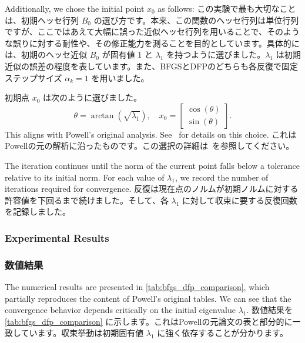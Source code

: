 \documentclass[0_main]{subfiles}
\begin{document}
    Additionally, we chose the initial point $x_0$ as follows:
\else
    この実験で最も大切なことは、初期ヘッセ行列 $B_0$ の選び方です。本来、この関数のヘッセ行列は単位行列ですが、ここではあえて大幅に誤った近似ヘッセ行列を用いることで、そのような誤りに対する耐性や、その修正能力を測ることを目的としています。具体的には、初期のヘッセ近似 $B_0$ が固有値 1 と $\lambda_1$ を持つように選びました。$\lambda_1$ は初期近似の誤差の程度を表しています。また、BFGSとDFPのどちらも各反復で固定ステップサイズ $\alpha_k = 1$ を用いました。

    初期点 $x_0$ は次のように選びました。
\fi
\begin{equation*}
    \theta = \arctan(\sqrt{\lambda_1}), \quad x_0 = \begin{bmatrix}\cos(\theta) \\ \sin(\theta)\end{bmatrix}.
\end{equation*}
\ifEn
    This aligns with Powell's original analysis. See~\citep{powellHowBadAre1986} for details on this choice.
\else
    これはPowellの元の解析に沿ったものです。この選択の詳細は~\citep{powellHowBadAre1986}を参照してください。
\fi

\ifEn
    The iteration continues until the norm of the current point falls below a tolerance relative to its initial norm. For each value of $\lambda_1$, we record the number of iterations required for convergence.
\else
    反復は現在点のノルムが初期ノルムに対する許容値を下回るまで続けました。そして、各 $\lambda_1$ に対して収束に要する反復回数を記録しました。
\fi

\ifEn
    \subsubsection{Experimental Results}
\else
    \subsubsection{数値結果}
\fi

\ifEn
    The numerical results are presented in \cref{tab:bfgs_dfp_comparison}, which partially reproduces the content of Powell's original tables. We can see that the convergence behavior depends critically on the initial eigenvalue $\lambda_1$.
\else
    数値結果を \cref{tab:bfgs_dfp_comparison} に示します。これはPowellの元論文の表と部分的に一致しています。収束挙動は初期固有値 $\lambda_1$ に強く依存することが分かります。
\fi
\end{document}
